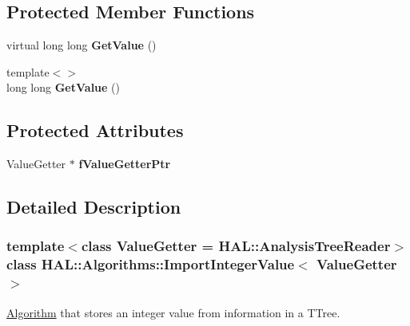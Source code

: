 \subsection*{Protected Member Functions}
\begin{DoxyCompactItemize}
\item 
\hypertarget{class_h_a_l_1_1_algorithms_1_1_import_integer_value_a5f157cd62c21c0421b4c7bbe29fa60ed}{virtual long long {\bfseries Get\+Value} ()}\label{class_h_a_l_1_1_algorithms_1_1_import_integer_value_a5f157cd62c21c0421b4c7bbe29fa60ed}

\item 
\hypertarget{class_h_a_l_1_1_algorithms_1_1_import_integer_value_a3ebdcf727dfd0e1005f5ca394090e300}{{\footnotesize template$<$$>$ }\\long long {\bfseries Get\+Value} ()}\label{class_h_a_l_1_1_algorithms_1_1_import_integer_value_a3ebdcf727dfd0e1005f5ca394090e300}

\end{DoxyCompactItemize}
\subsection*{Protected Attributes}
\begin{DoxyCompactItemize}
\item 
\hypertarget{class_h_a_l_1_1_algorithms_1_1_import_integer_value_af6ad5771bb63a3e813583f428095e831}{Value\+Getter $\ast$ {\bfseries f\+Value\+Getter\+Ptr}}\label{class_h_a_l_1_1_algorithms_1_1_import_integer_value_af6ad5771bb63a3e813583f428095e831}

\end{DoxyCompactItemize}


\subsection{Detailed Description}
\subsubsection*{template$<$class Value\+Getter = H\+A\+L\+::\+Analysis\+Tree\+Reader$>$class H\+A\+L\+::\+Algorithms\+::\+Import\+Integer\+Value$<$ Value\+Getter $>$}

\hyperlink{class_h_a_l_1_1_algorithm}{Algorithm} that stores an integer value from information in a T\+Tree. 

